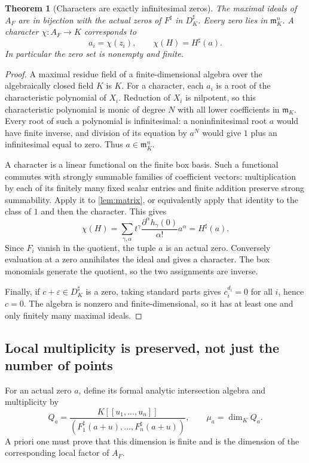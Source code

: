 \documentclass[11pt,letterpaper]{article}
\newtheorem{theorem}{Theorem}[section]
\theoremstyle{definition}
\theoremstyle{remark}
\newcommand{\mm}{\mathfrak m}
\newcommand{\sh}{^{\sharp}}
\numberwithin{equation}{section}
\begin{document}
\begin{theorem}[Characters are exactly infinitesimal zeros]\label{thm:points}
The maximal ideals of $A_F$ are in bijection with the actual zeros of $F\sh$ in $D_K\sh$. Every zero lies in $\mm_K^n$. A character $\chi:A_F\to K$ corresponds to
\[
 a_i=\chi(z_i),\qquad \chi(H)=H\sh(a).
\]
In particular the zero set is nonempty and finite.
\end{theorem}
\begin{proof}
A maximal residue field of a finite-dimensional algebra over the algebraically closed field $K$ is $K$. For a character, each $a_i$ is a root of the characteristic polynomial of $X_i$. Reduction of $X_i$ is nilpotent, so this characteristic polynomial is monic of degree $N$ with all lower coefficients in $\mm_K$. Every root of such a polynomial is infinitesimal: a noninfinitesimal root $a$ would have finite inverse, and division of its equation by $a^N$ would give $1$ plus an infinitesimal equal to zero. Thus $a\in\mm_K^n$.

A character is a linear functional on the finite box basis. Such a functional commutes with strongly summable families of coefficient vectors: multiplication by each of its finitely many fixed scalar entries and finite addition preserve strong summability. Apply it to \cref{lem:matrix}, or equivalently apply that identity to the class of $1$ and then the character. This gives
\[
 \chi(H)=\sum_{\gamma,\alpha}t^\gamma
       \frac{\partial^\alpha h_\gamma(0)}{\alpha!}a^\alpha
       =H\sh(a).
\]
Since $F_i$ vanish in the quotient, the tuple $a$ is an actual zero. Conversely evaluation at a zero annihilates the ideal and gives a character. The box monomials generate the quotient, so the two assignments are inverse.

Finally, if $c+\varepsilon\in D_K\sh$ is a zero, taking standard parts gives $c_i^{d_i}=0$ for all $i$, hence $c=0$. The algebra is nonzero and finite-dimensional, so it has at least one and only finitely many maximal ideals.
\end{proof}

\subsection{Local multiplicity is preserved, not just the number of points}
For an actual zero $a$, define its formal analytic intersection algebra and multiplicity by
\begin{equation}\label{eq:localalg}
 Q_a=\frac{K[[u_1,\ldots,u_n]]}{
      (F_1\sh(a+u),\ldots,F_n\sh(a+u))},
 \qquad \mu_a=\dim_K Q_a.
\end{equation}
A priori one must prove that this dimension is finite and is the dimension of the corresponding local factor of $A_F$.
\end{document}
